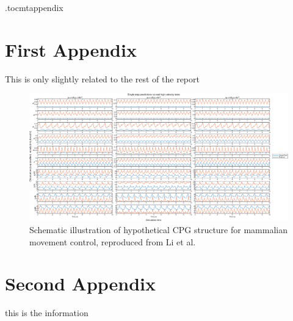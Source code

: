 \newpage
\appendix
\newpage

\etocdepthtag.toc{mtappendix}
\tableofcontents
\pagestyle{plain}
\newpage
{}

\chapter{First Appendix}
This is only slightly related to the rest of the report

\begin{figure}[ht]
    \centering
    \includegraphics[width=\linewidth]{img/AppA/rq1_pi51_1.eps}
    \caption{Schematic illustration of hypothetical \ac{CPG} structure for mammalian movement control, reproduced from Li et al.\cite{liHumanoidsLearningWalk2013}}
\end{figure}


\chapter{Second Appendix}
this is the information

